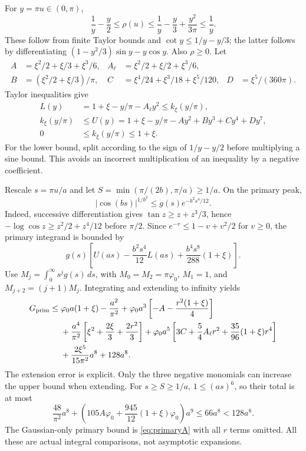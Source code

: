\documentclass[11pt]{article}
\newcommand{\phz}{\varphi_0}
\begin{document}
For $y=\pi u\in(0,\pi)$,
\[
 \frac1y-\frac y2\le\rho(u)
 \le\frac1y-\frac y3+\frac{y^2}{3\pi}\le\frac1y.
\]
These follow from finite Taylor bounds and
$\cot y\le1/y-y/3$; the latter follows by differentiating
$(1-y^2/3)\sin y-y\cos y$. Also $\rho\ge0$.
Let
\begin{align*}
 A&=\xi^2/2+\xi/3+\xi^3/6,& A_\ell&=\xi^2/2+\xi/2+\xi^3/6,\\
 B&=(\xi^2/2+\xi/3)/\pi,&
 C&=\xi^4/24+\xi^3/18+\xi^5/120,&D&=\xi^5/(360\pi).
\end{align*}
Taylor inequalities give
\begin{align*}
 L(y)&=1+\xi-y/\pi-A_\ell y^2\le k_\xi(y/\pi),\\
 k_\xi(y/\pi)&\le U(y)=1+\xi-y/\pi-Ay^2+By^3+Cy^4+Dy^7,\\
 0&\le k_\xi(y/\pi)\le1+\xi.
\end{align*}
For the lower bound, split according to the sign of $1/y-y/2$ before
multiplying a sine bound. This avoids an incorrect multiplication of an
inequality by a negative coefficient.

Rescale $s=\pi u/a$ and let $S=\min(\pi/(2b),\pi/a)\ge1/a$.
On the primary peak,
\[
 |\cos(bs)|^{1/b^2}\le g(s)e^{-b^2s^4/12}.
\]
Indeed, successive differentiation gives $\tan z\ge z+z^3/3$, hence
$-\log\cos z\ge z^2/2+z^4/12$ before $\pi/2$.
Since $e^{-v}\le1-v+v^2/2$ for $v\ge0$, the primary integrand is bounded by
\[
 g(s)\left[U(as)-\frac{b^2s^4}{12}L(as)
              +\frac{b^4s^8}{288}(1+\xi)\right].
\]
Use $M_j=\int_0^\infty s^jg(s)\,ds$, with
$M_0=M_2=\pi\phz$, $M_1=1$, and $M_{j+2}=(j+1)M_j$.
Integrating and extending to infinity yields
\begin{align}
 G_{\rm prim}\le{}&\phz a(1+\xi)-\frac{a^2}{\pi^2}
 +\phz a^3\left[-A-\frac{r^2(1+\xi)}4\right]\notag\\
 &+\frac{a^4}{\pi^2}\left[\xi^2+\frac{2\xi}3+\frac{2r^2}3\right]
 +\phz a^5\left[3C+\frac54 A_\ell r^2+\frac{35}{96}(1+\xi)r^4\right]\notag\\
 &+\frac{2\xi^5}{15\pi^2}a^8+128a^8.\label{eq:primaryA}
\end{align}
The extension error is explicit. Only the three negative monomials can
increase the upper bound when extending. For $s\ge S\ge1/a$,
$1\le(as)^6$, so their total is at most
\[
 \frac{48}{\pi^2}a^8+
 \left(105A\phz+\frac{945}{12}(1+\xi)\phz\right)a^9
 \le66a^8<128a^8.
\]
The Gaussian-only primary bound is \eqref{eq:primaryA} with all $r$ terms
omitted. All these are actual integral comparisons, not asymptotic expansions.
\end{document}
